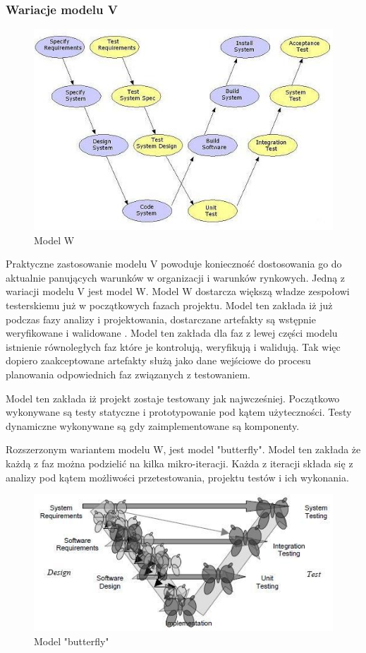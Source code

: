 \subsubsection{Wariacje modelu V}
\begin{figure}[h]
\centerline{\includegraphics[scale=0.5]{img/Wmodel3.JPG}}
\caption{Model W  \cite{wmodel}}
\label{fig:wmodel}
\end{figure}

Praktyczne zastosowanie modelu V powoduje konieczność dostosowania go do aktualnie panujących warunków w organizacji i warunków rynkowych. Jedną z wariacji modelu V jest model W. Model W dostarcza większą władze zespołowi testerskiemu już w początkowych fazach projektu. Model ten zakłada iż już podczas fazy analizy i projektowania, dostarczane artefakty są wstępnie weryfikowane i walidowane \cite{wmodel}. Model ten zakłada dla faz z lewej części modelu istnienie równoległych faz które je kontrolują, weryfikują i walidują. Tak więc dopiero zaakceptowane artefakty służą jako dane wejściowe do procesu planowania odpowiednich faz związanych z testowaniem.

Model ten zakłada iż projekt zostaje testowany jak najwcześniej. Początkowo wykonywane są testy statyczne i prototypowanie pod kątem użyteczności. Testy dynamiczne wykonywane są gdy zaimplementowane są komponenty.


Rozszerzonym wariantem modelu W, jest model "butterfly"\cite{BUTTERFLY}. Model ten zakłada że każdą z faz można podzielić na kilka mikro-iteracji. Każda z iteracji składa się z analizy pod kątem możliwości przetestowania, projektu testów i ich wykonania. 
\begin{figure}[h]
\centerline{\includegraphics[scale=0.5]{img/butterflymodel2.JPG}}
\caption{Model "butterfly" \cite{BUTTERFLY}} 
\label{fig:vmodel}
\end{figure}
